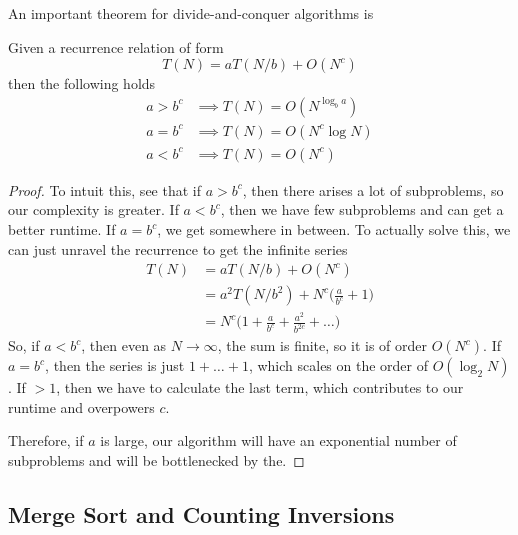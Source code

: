   An important theorem for divide-and-conquer algorithms is 

  \begin{theorem}
    Given a recurrence relation of form 
    \begin{equation}
      T(N) = a T(N/b) + O(N^c)
    \end{equation}
    then the following holds 
    \begin{align}
      a > b^c & \implies T(N) = O(N^{\log_b a}) \\
      a = b^c & \implies T(N) = O(N^c \log{N}) \\
      a < b^c & \implies T(N) = O(N^c) 
    \end{align}
  \end{theorem}
  \begin{proof}
    To intuit this, see that if $a > b^c$, then there arises a lot of subproblems, so our complexity is greater. If $a < b^c$, then we have few subproblems and can get a better runtime. If $a = b^c$, we get somewhere in between. To actually solve this, we can just unravel the recurrence to get the infinite series 
    \begin{align}
      T(N) & = a T(N/b) + O(N^c) \\
           & = a^2 T(N/b^2) +  N^c \bigg( \frac{a}{b^c} + 1 \bigg) \\
           & =  N^c \bigg( 1 + \frac{a}{b^c} + \frac{a^2}{b^{2c}} + \ldots \bigg)
    \end{align}
    So, if $a < b^c$, then even as $N \rightarrow \infty$, the sum is finite, so it is of order $O(N^c)$. If $a = b^c$, then the series is just $1 + \ldots + 1$, which scales on the order of $O(\log_2 {N})$. If $> 1$, then we have to calculate the last term, which contributes to our runtime and overpowers $c$.  
    
    Therefore, if $a$ is large, our algorithm will have an exponential number of subproblems and will be bottlenecked by the. 
  \end{proof}

\subsection{Merge Sort and Counting Inversions}

